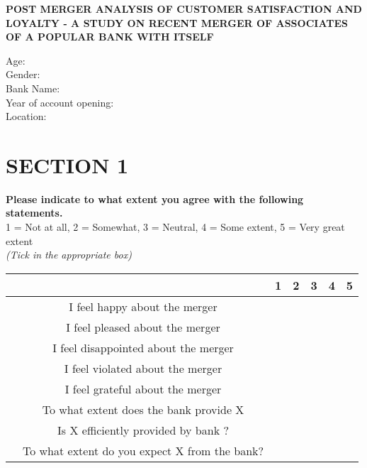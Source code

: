 \documentclass[11pt,a4paper]{article}
\newcounter{magicrownumbers}
\newcommand\rownumber{\stepcounter{magicrownumbers}\arabic{magicrownumbers}}
\newcommand \tab[1][1cm]{\hspace*{#1}}
\begin{document}
\begin{center}
{\LARGE{\textbf{POST MERGER ANALYSIS OF CUSTOMER SATISFACTION AND LOYALTY - A STUDY ON RECENT MERGER OF ASSOCIATES OF A POPULAR BANK WITH ITSELF}}}\\
\end{center}
Age:\\
Gender:\\
Bank Name:\\
Year of account opening:\\
Location:\\
\noindent\makebox[\linewidth]{\rule{\paperwidth}{0.4pt}}
{\selectfont
\section*{SECTION 1}
\textbf{Please indicate to what extent you agree with the following statements.} \\
1 = Not at all, 2 = Somewhat, 3 = Neutral, 4 = Some extent, 5 = Very great extent\\
\emph {(Tick in the appropriate box)}\\
\begin{minipage}{\textwidth}

\begin{tabular}{|c|c|c|c|c|c|c|}
\hline \multicolumn{2}{|c|}{} & 1 & 2 & 3 & 4 & 5\\
\hline \rownumber & I feel happy about the merger & \tab & \tab & \tab & \tab & \tab \\
\hline \rownumber & I feel pleased about the merger & \tab & \tab & \tab & \tab & \tab \\
\hline \rownumber & I feel disappointed about the merger & \tab & \tab & \tab & \tab & \tab \\
\hline \rownumber & I feel violated about the merger & \tab & \tab & \tab & \tab & \tab \\
\hline \rownumber & I feel grateful about the merger & \tab & \tab & \tab & \tab & \tab \\
\hline \rownumber & To what extent does the bank provide X  & \tab & \tab & \tab & \tab & \tab \\
\hline \rownumber & Is X efficiently provided by bank ? & \tab & \tab & \tab & \tab & \tab \\
\hline \rownumber & To what extent do you expect X from the bank? & \tab & \tab & \tab & \tab & \tab \\
\hline
\end{tabular}


\end{minipage}}
\end{document}
